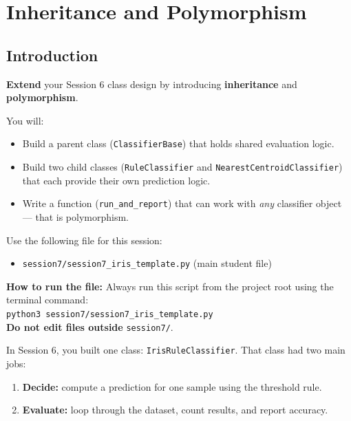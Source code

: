 \chapter{Inheritance and Polymorphism}

\section{Introduction}

\begin{tcolorbox}[title=Goal]
\textbf{Extend} your Session 6 class design by introducing \textbf{inheritance} and \textbf{polymorphism}.

\medskip
\noindent
You will:
\begin{itemize}\setlength{\itemsep}{2pt}
    \item Build a parent class (\texttt{ClassifierBase}) that holds shared evaluation logic.
    \item Build two child classes (\texttt{RuleClassifier} and \texttt{NearestCentroidClassifier}) that each provide their own prediction logic.
    \item Write a function (\texttt{run\_and\_report}) that can work with \textit{any} classifier object --- that is polymorphism.
\end{itemize}
\end{tcolorbox}

\begin{tcolorbox}[title=You will work in]
Use the following file for this session:
\begin{itemize}
    \item \texttt{session7/session7\_iris\_template.py} (main student file)
\end{itemize}
\textbf{How to run the file:} Always run this script from the project root using the terminal command: \\
\texttt{python3 session7/session7\_iris\_template.py} \\
\textbf{Do not edit files outside} \texttt{session7/}.
\end{tcolorbox}

In Session 6, you built one class: \texttt{IrisRuleClassifier}.
That class had two main jobs:
\begin{enumerate}
    \item \textbf{Decide:} compute a prediction for one sample using the threshold rule.
    \item \textbf{Evaluate:} loop through the dataset, count results, and report accuracy.
\end{enumerate}

